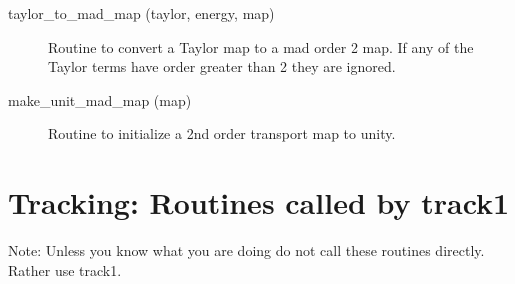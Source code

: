 \begin{description}
\label{r:taylor.to.mad.map}
\item[taylor_to_mad_map (taylor, energy, map)] \Newline 
     Routine to convert a Taylor map to a mad order 2 map.
     If any of the Taylor terms have order greater than 2 they are ignored.

\label{r:make.unit.mad.map}
\item[make_unit_mad_map (map)] \Newline 
     Routine to initialize a 2nd order transport map to unity.


\end{description}

\section{Tracking: Routines called by track1}
\label{r:track1.call}   

Note: Unless you know what you are doing do not call these routines directly. Rather use
track1.

